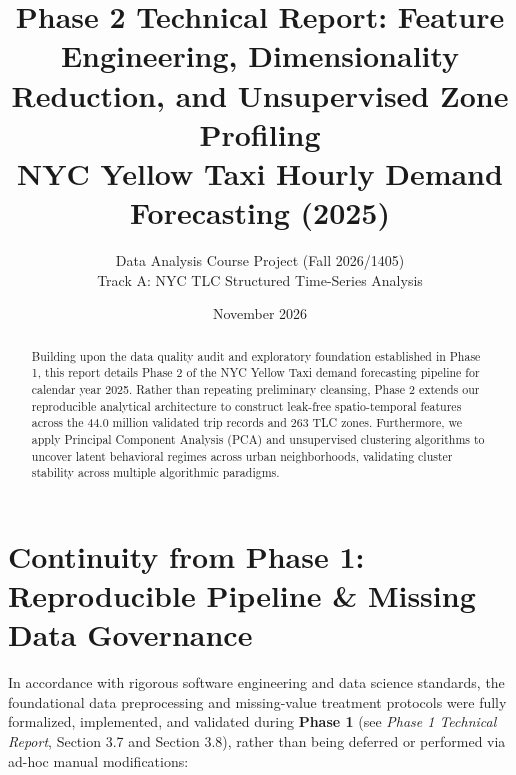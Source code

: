 \documentclass[11pt,a4paper]{article}
\title{\textbf{\Large Phase 2 Technical Report: Feature Engineering, Dimensionality Reduction, and Unsupervised Zone Profiling} \\ 
\large NYC Yellow Taxi Hourly Demand Forecasting (2025)}
\author{Data Analysis Course Project (Fall 2026/1405) \\ 
Track A: NYC TLC Structured Time-Series Analysis}
\date{November 2026}
\begin{document}
\maketitle

\begin{abstract}
Building upon the data quality audit and exploratory foundation established in Phase 1, this report details Phase 2 of the NYC Yellow Taxi demand forecasting pipeline for calendar year 2025. Rather than repeating preliminary cleansing, Phase 2 extends our reproducible analytical architecture to construct leak-free spatio-temporal features across the $44.0$ million validated trip records and $263$ TLC zones. Furthermore, we apply Principal Component Analysis (PCA) and unsupervised clustering algorithms to uncover latent behavioral regimes across urban neighborhoods, validating cluster stability across multiple algorithmic paradigms.
\end{abstract}

\section{Continuity from Phase 1: Reproducible Pipeline \& Missing Data Governance}
In accordance with rigorous software engineering and data science standards, the foundational data preprocessing and missing-value treatment protocols were fully formalized, implemented, and validated during \textbf{Phase 1} (see \textit{Phase 1 Technical Report}, Section 3.7 and Section 3.8), rather than being deferred or performed via ad-hoc manual modifications:
\end{document}
